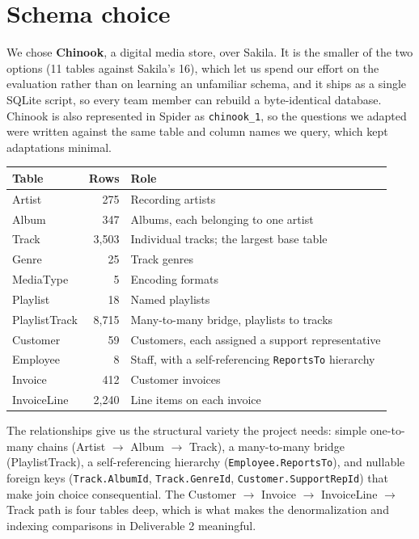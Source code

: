 \documentclass[11pt]{article}
\begin{document}
\section{Schema choice}\label{sec:schema}

We chose \textbf{Chinook}, a digital media store, over Sakila. It is the smaller of the two
options (11 tables against Sakila's 16), which let us spend our effort on the evaluation rather
than on learning an unfamiliar schema, and it ships as a single SQLite script, so every team
member can rebuild a byte-identical database. Chinook is also represented in Spider as
\texttt{chinook\_1}, so the questions we adapted were written against the same table and column
names we query, which kept adaptations minimal.

\begin{center}
\begin{tabular}{@{}lrl@{}}
\toprule
\textbf{Table} & \textbf{Rows} & \textbf{Role} \\
\midrule
Artist        & 275   & Recording artists \\
Album         & 347   & Albums, each belonging to one artist \\
Track         & 3{,}503 & Individual tracks; the largest base table \\
Genre         & 25    & Track genres \\
MediaType     & 5     & Encoding formats \\
Playlist      & 18    & Named playlists \\
PlaylistTrack & 8{,}715 & Many-to-many bridge, playlists to tracks \\
Customer      & 59    & Customers, each assigned a support representative \\
Employee      & 8     & Staff, with a self-referencing \texttt{ReportsTo} hierarchy \\
Invoice       & 412   & Customer invoices \\
InvoiceLine   & 2{,}240 & Line items on each invoice \\
\bottomrule
\end{tabular}
\end{center}

The relationships give us the structural variety the project needs: simple one-to-many chains
(Artist $\rightarrow$ Album $\rightarrow$ Track), a many-to-many bridge (PlaylistTrack), a
self-referencing hierarchy (\texttt{Employee.ReportsTo}), and nullable foreign keys
(\texttt{Track.AlbumId}, \texttt{Track.GenreId}, \texttt{Customer.SupportRepId}) that make join
choice consequential. The Customer $\rightarrow$ Invoice $\rightarrow$ InvoiceLine
$\rightarrow$ Track path is four tables deep, which is what makes the denormalization and
indexing comparisons in Deliverable 2 meaningful.
\end{document}
